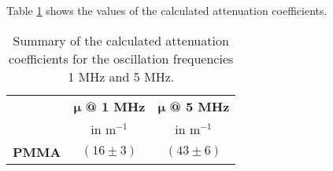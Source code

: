 Table \ref{tab:Attenuation_Coefficient} shows the values of the calculated attenuation coefficients.

\begin{table}[H]
	\centering
	\renewcommand{\arraystretch}{1.1}
	\begin{tabular}{|l|c|c|}
		\cline{2-3}
		\multicolumn{1}{c|}{} & $\boldsymbol{\mu}$ \textbf{@ 1 MHz} & $\boldsymbol{\mu}$ \textbf{@ 5 MHz} \\
		\multicolumn{1}{c|}{} & in m$^{-1}$ & in m$^{-1}$ \\
		\hline
		\textbf{PMMA} & $(16\pm 3)$ & $(43\pm 6)$ \\
		\hline
	\end{tabular}
	\caption{Summary of the calculated attenuation coefficients for the oscillation frequencies 1 MHz and 5 MHz.}
	\label{tab:Attenuation_Coefficient}
\end{table}
